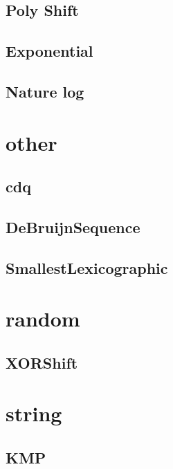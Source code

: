 \documentclass[a4paper,10pt,twocolumn,oneside]{article}
\begin{document}
    \subsection{Poly Shift}
    

    \subsection{Exponential}
    

    \subsection{Nature log}
    

\section{other}
    \subsection{cdq}
    

    \subsection{DeBruijnSequence}
    

    \subsection{SmallestLexicographic}
    

\section{random}
    \subsection{XORShift}
    

\section{string}
    \subsection{KMP}
    
\end{document}
